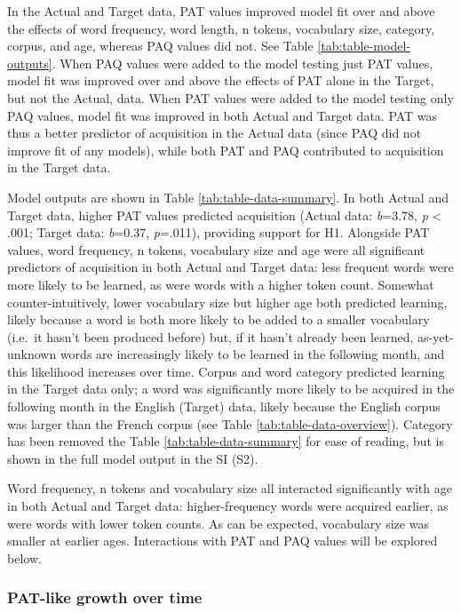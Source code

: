 \documentclass[
  man]{apa6}
\begin{document}
In the Actual and Target data, PAT values improved model fit over and above the effects of word frequency, word length, n tokens, vocabulary size, category, corpus, and age, whereas PAQ values did not. See Table \ref{tab:table-model-outputs}. When PAQ values were added to the model testing just PAT values, model fit was improved over and above the effects of PAT alone in the Target, but not the Actual, data. When PAT values were added to the model testing only PAQ values, model fit was improved in both Actual and Target data. PAT was thus a better predictor of acquisition in the Actual data (since PAQ did not improve fit of any models), while both PAT and PAQ contributed to acquisition in the Target data.

Model outputs are shown in Table \ref{tab:table-data-summary}. In both Actual and Target data, higher PAT values predicted acquisition (Actual data: \emph{b}=3.78, \emph{p} \textless{} .001; Target data: \emph{b}=0.37, \emph{p}=.011), providing support for H1. Alongside PAT values, word frequency, n tokens, vocabulary size and age were all significant predictors of acquisition in both Actual and Target data: less frequent words were more likely to be learned, as were words with a higher token count. Somewhat counter-intuitively, lower vocabulary size but higher age both predicted learning, likely because a word is both more likely to be added to a smaller vocabulary (i.e.~it hasn't been produced before) but, if it hasn't already been learned, as-yet-unknown words are increasingly likely to be learned in the following month, and this likelihood increases over time. Corpus and word category predicted learning in the Target data only; a word was significantly more likely to be acquired in the following month in the English (Target) data, likely because the English corpus was larger than the French corpus (see Table \ref{tab:table-data-overview}). Category has been removed the Table \ref{tab:table-data-summary} for ease of reading, but is shown in the full model output in the SI (S2).

Word frequency, n tokens and vocabulary size all interacted significantly with age in both Actual and Target data: higher-frequency words were acquired earlier, as were words with lower token counts. As can be expected, vocabulary size was smaller at earlier ages. Interactions with PAT and PAQ values will be explored below.

\hypertarget{pat-like-growth-over-time}{%
\subsubsection{PAT-like growth over time}\label{pat-like-growth-over-time}}
\end{document}
